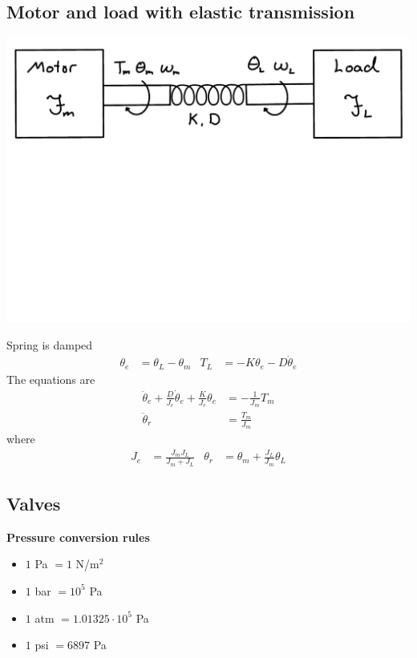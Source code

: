 \setcounter{subsection}{4}
\subsection{Motor and load with elastic transmission} %
\begin{Figure}
    \includegraphics[clip, trim = 0cm 9cm 0cm 0cm,width=\linewidth]{figures/motor-load.pdf}
    \label{fig:motor-load}
\end{Figure}
Spring is damped
\begin{align*}
    \theta_e &= \theta_L - \theta_m & T_L &= -K\theta_e - D\dot{\theta}_e
\end{align*}
The equations are
\begin{align*}
    \ddot{\theta}_e + \frac{D}{J_e}\dot{\theta}_e + \frac{K}{J_e}\theta_e &= -\frac{1}{J_m} T_m \\
    \ddot{\theta}_r &= \frac{T_m}{J_m}
\end{align*}
where
\begin{align*}
    J_e &= \frac{J_m J_L}{J_m + J_L} & \theta_r &= \theta_m + \frac{J_L}{J_m}\theta_L
\end{align*}

\setcounter{section}{4}
\setcounter{subsection}{1}
\subsection{Valves} %

\textbf{Pressure conversion rules}
\begin{itemize}
    \item \(1\) Pa \(= 1\) N/m\(^2\)
    \item \(1\) bar \(= 10^5\) Pa
    \item \(1\) atm \(= 1.01325\cdot10^5\) Pa
    \item \(1\) psi \(= 6897\) Pa
\end{itemize}

